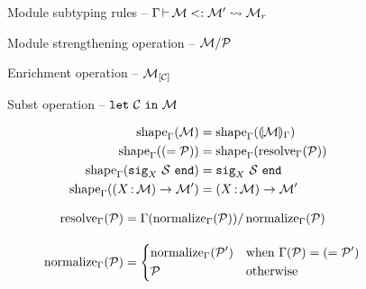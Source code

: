 \documentclass{article}
\theoremstyle{definition}
\begin{document}
\begin{figure}[tbp]
  \vspace{-3mm}
  \caption{Module subtyping rules -- $\submod{\E}{\iM}{\iM'}{\iM_r}$}
  \label{module:subtyping}
\end{figure}

\begin{figure}[tbp]
  
  \caption{Module strengthening operation -- $\Sstrengthen{l}{\iP}{\iM}$}
  \label{module:strengthen}
\end{figure}

\begin{figure}[tbp]
  
  \caption{Enrichment operation -- $\Senrich{\iC}{\iM}$}
  \label{module:enrich}
\end{figure}

\begin{figure}[tbp]
  
  \caption{Subst operation -- $\Ssubst{\iC}{\iM}$}
  \label{module:subst}
\end{figure}

\begin{figure}[tbp]
  \vspace{-3mm}
  \caption{Lookup rules -- $\lookup{\E}{\ip} = \iM$}
  \label{module:lookup}

  \begin{subfigure}[t]{0.5\linewidth}
    \begin{align*}
      \Oshape{\E}{\iM} &= \Oshape{\E}{\Oreduce{\E}{\iM}}\\
      \Oshape{\E}{\Salias{\iP}} &= \Oshape{\E}{\resolve{\E}{\iP}}\\
      \Oshape{\E}{\Ssig{\ix}{\iS}} &= \Ssig{\ix}{\iS}\\
      \Oshape{\E}{\Sfunctor{\ix}{\iM}{\iM'}} &= \Sfunctor{\ix}{\iM}{\iM'}
    \end{align*}
  \end{subfigure}
  \begin{subfigure}[t]{0.5\linewidth}
    \begin{align*}
      \resolve{\E}{\iP}
      &= \Sstrengthen{}{\Onormalize{\E}{\iP}}{\lookup{\E}{\Onormalize{\E}{\iP}}}
      \\[1em]
      \Onormalize{\E}{\iP}
      &=
        \begin{dcases}
          \Onormalize{\E}{\iP'} & \text{when } \lookup{\E}{\iP} = \Salias{\iP'} \\
          \iP & \text{otherwise}
        \end{dcases}
    \end{align*}
  \end{subfigure}

\end{figure}
\end{document}
